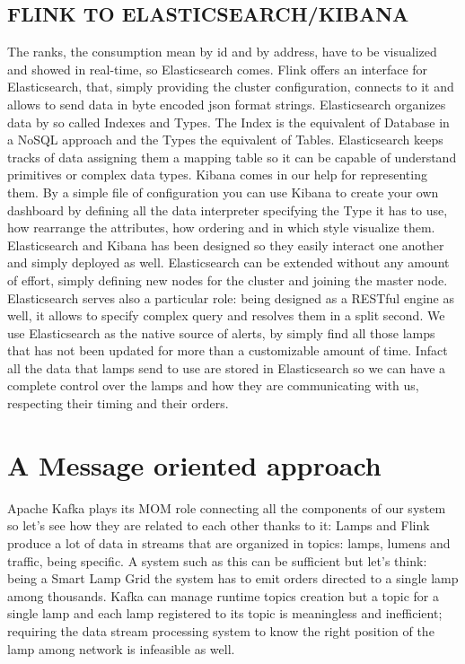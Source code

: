 \subsection{FLINK TO ELASTICSEARCH/KIBANA}
The ranks, the consumption mean by id and by address, have to be visualized and showed in real-time, so Elasticsearch comes. Flink offers an interface for Elasticsearch, that, simply providing the cluster configuration, connects to it and allows to send data in byte encoded json format strings. Elasticsearch organizes data by so called Indexes and Types. The Index is the equivalent of Database in a NoSQL approach and the Types the equivalent of Tables. Elasticsearch keeps tracks of data assigning them a mapping table so it can be capable of understand primitives or complex data types. Kibana comes in our help for representing them. By a simple file of configuration you can use Kibana to create your own dashboard by defining all the data interpreter specifying the Type it has to use, how rearrange the attributes, how ordering and in which style visualize them. Elasticsearch and Kibana has been designed so they easily interact one another and simply deployed as well. Elasticsearch can be extended without any amount of effort, simply defining new nodes for the cluster and joining the master node. Elasticsearch serves also a particular role: being designed as a RESTful engine as well, it allows to specify complex query and resolves them in a split second. We use Elasticsearch as the native source of alerts, by simply find all those lamps that has not been updated for more than a customizable amount of time. Infact all the data that lamps send to use are stored in Elasticsearch so we can have a complete control over the lamps and how they are communicating with us, respecting their timing and their orders.

\section{A Message oriented approach}
Apache Kafka plays its MOM role connecting all the components of our system so let’s see how they are related to each other thanks to it: Lamps and Flink produce a lot of data in streams that are organized in topics: lamps, lumens and traffic, being specific. A system such as this can be sufficient but let’s think: being a Smart Lamp Grid the system has to emit orders directed to a single lamp among thousands. Kafka can manage runtime topics creation but a topic for a single lamp and each lamp registered to its topic is meaningless and inefficient; requiring the data stream processing system to know the right position of the lamp among network is infeasible as well.


